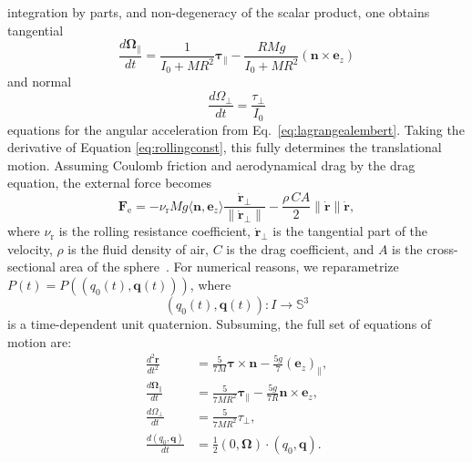 integration by parts, and non-degeneracy of the scalar product, one obtains tangential 
\begin{equation}
    \label{eq:tangangularvel}
    \frac{d \bm{\Omega}_\|}{dt} = \frac{1}{I_0+MR^2} \bm{\tau}_\| - \frac{RMg}{I_0+MR^2}(\bm{n} \times \bm{e}_z) 
\end{equation}
and normal 
\begin{equation}
    \label{eq:normalangularvel}
    \frac{d \Omega_\perp}{dt} = \frac{\tau_\perp}{I_0}
\end{equation}
equations for the angular acceleration from Eq.~\ref{eq:lagrangealembert}. Taking the derivative of Equation \ref{eq:rollingconst}, this fully determines the translational motion. Assuming Coulomb friction and aerodynamical drag by the drag equation, the external force becomes 
\begin{equation}
    \label{eq:friction}
    \bm{F}_\text{e} = - \nu_\text{r} Mg \langle \bm{n},\bm{e}_z\rangle \frac{\dot{\bm{r}}_\perp}{\|\dot{\bm{r}}_\perp\|} - \frac{\rho \, C A}{2} \|\dot{\bm{r}}\| \dot{\bm{r}}
    ,\end{equation} 
    where $\nu_\text{r}$ is the rolling resistance coefficient, $\dot{\bm{r}}_\perp$ is the tangential part of the velocity, $\rho$ is the fluid density of air, $C$ is the drag coefficient, and $A$ is the cross-sectional area of the sphere~\cite{Coulomb, Hayakawa2005, Landau2002}. For numerical reasons, we reparametrize $P(t)=P((q_0(t),\bm{q}(t)))$, where \[
(q_0(t), \bm{q}(t)): I \to \mathbb{S}^3
\] is a time-dependent unit quaternion. Subsuming, the full set of equations of motion are:
\begin{equation}
    \label{eq:eom}
    \begin{aligned}
        \frac{d^2 \bm{r}}{dt^2}&= \frac{5}{7M} \bm{\tau} \times \bm{n} - \frac{5g}{7} (\bm{e}_z)_\|, \\
        \frac{d\bm{\Omega}_\|}{dt} &= \frac{5}{7MR^2}\bm{\tau}_\| - \frac{5g}{7R} \bm{n} \times \bm{e}_z,\\
        \frac{d \Omega_\perp}{dt} &= \frac{5}{7MR^2} \tau_\perp, \\
        \frac{d(q_0,\bm{q})}{dt}&=\frac{1}{2}(0, \bm{\Omega}) \cdot (q_0, \bm{q}).
\end{aligned}
\end{equation}
